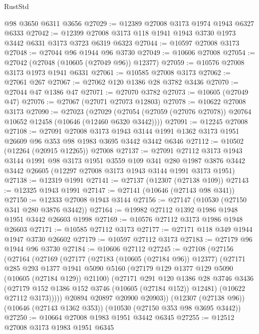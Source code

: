 \begin{lexlean}{RustStd}
\begin{coremodule}
    @98
    @3650
    @6311
    @3656
@27029 := @12389 @27008 @3173 @1974 @1943 @6327 @6333
@27042 := @12399 @27008 @3173 @118 @1941 @1943 @3730 @1973 @3442 @6331 @3173 @3723 @6319 @6323
@27044 := @10597 @27008 @3173
@27048 := @27044 @96 @1944 @96 @3730
@27049 := @10606 @27008
@27054 := @27042 (@27048 (@10605 (@27049 @96)) @12377)
@27059 := @10576 @27008 @3173 @1973 @1941 @6331
@27061 := @10585 @27008 @3173
@27062 := @27061 @267
@27067 := @27062 @120 @1386 @28 @3782 @3436
@27070 := @27044 @47 @1386 @47
@27071 := @27070 @3782
@27073 := @10605 (@27049 @47)
@27076 := @27067 (@27071 @27073 @12803)
@27078 := @10622 @27008 @3173
@27090 := @27023
    (@27029 (@27054 (@27059 (@27076 @27078)) @20764 @10652 @12458 (@10646 (@12460 @6320 @3442))))
@27091 := @12245 @27008
@27108 := @27091
    @27008
    @3173
    @1943
    @3144
    @1991
    @1362
    @3173
    @1951
    @26609
    @96
    @353
    @98
    @1983
    @3695
    @3442
    @3442
    @6346
@27112 := @10502 (@12264 (@20915 @12265)) @27008
@27137 := @27091
    @27112
    @3173
    @1943
    @3144
    @1991
    @98
    @3173
    @1951
    @3559
    @109
    @341
    @280
    @1987
    @3876
    @3442
    @3442
    @26605
    (@12297 @27008 @3173 @1943 @3144 @1991 @3173 @1951)
@27138 := @12319 @1991
@27141 := @27137 (@12307 (@27138 @109))
@27143 := @12325 @1943 @1991
@27147 := @27141 (@10646 (@27143 @98 @341))
@27150 := @12333 @27008 @1943 @3144
@27156 := @27147 (@10530 (@27150 @341 @280 @3876 @3442))
@27164 := @19982 @27112 @1392 @1986 @1948 @1951 @3442 @26603 @1998
@27169 := @10576 @27112 @3173 @1986 @1948 @26603
@27171 := @10585 @27112 @3173
@27177 := @27171 @118 @349 @1944 @1947 @3730 @26602
@27179 := @10597 @27112 @3173
@27183 := @27179 @96 @1944 @96 @3730
@27184 := @10606 @27112
@27245 := @27108
    (@27156
      (@27164
        (@27169
          (@27177
            (@27183 (@10605 (@27184 @96)) @12377)
            (@27171
              @285
              @293
              @1377
              @1941
              @5090
              @5160
              (@27179 @129 @1377 @129 @5090 (@10605 (@27184 @129)) @21100)
              (@27171
                @291
                @120
                @1386
                @28
                @3746
                @3436
                (@27179 @152 @1386 @152 @3746 (@10605 (@27184 @152)) @12481)
                (@10622 @27112 @3173)))))
        @20894
        @20897
        @20900
        @20903))
    (@12307 (@27138 @96))
    (@10646 (@27143 @1362 @353))
    (@10530 (@27150 @353 @98 @3695 @3442))
@27250 := @10664 @27008 @1983 @1951 @3442 @6345
@27255 := @12512 @27008 @3173 @1983 @1951 @6345

\end{coremodule}
\end{lexlean}

